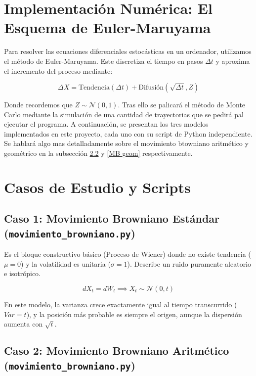 \documentclass[11pt]{article}
\begin{document}
	\section{Implementación Numérica: El Esquema de Euler-Maruyama}
		Para resolver las ecuaciones diferenciales estocásticas en un ordenador, utilizamos el método de Euler-Maruyama. Este discretiza el tiempo en pasos $\Delta t$ y aproxima el incremento del proceso mediante:
		
	\begin{equation}
		\Delta X = \text{Tendencia}(\Delta t) + \text{Difusión}(\sqrt{\Delta t}, Z)
	\end{equation}
	
		Donde recordemos que $Z \sim \mathcal{N}(0,1)$. Tras ello se palicará el método de Monte Carlo mediante la simulación de una cantidad de trayectorias que se pedirá pal ejecutar el programa. A continuación, se presentan los tres modelos implementados en este proyecto, cada uno con su script de Python independiente. Se hablará algo mas detalladamente sobre el movimiento btowniano aritmético y geométrico en la subsección \ref{MB arit} y \ref{MB geom} respectivamente.
	
	\section{Casos de Estudio y Scripts}
	
		\subsection{Caso 1: Movimiento Browniano Estándar (\texttt{movimiento\_browniano.py})}
			Es el bloque constructivo básico (Proceso de Wiener) donde no existe tendencia ($\mu=0$) y la volatilidad es unitaria ($\sigma=1$). Describe un ruido puramente aleatorio e isotrópico.
			
			\begin{equation}
				dX_t = dW_t \implies X_t \sim \mathcal{N}(0, t)
			\end{equation}
			
			En este modelo, la varianza crece exactamente igual al tiempo transcurrido ($Var = t$), y la posición más probable es siempre el origen, aunque la dispersión aumenta con $\sqrt{t}$.
			
		\subsection{Caso 2: Movimiento Browniano Aritmético (\texttt{movimiento\_browniano.py})}
			\label{MB arit}
			
\end{document}
